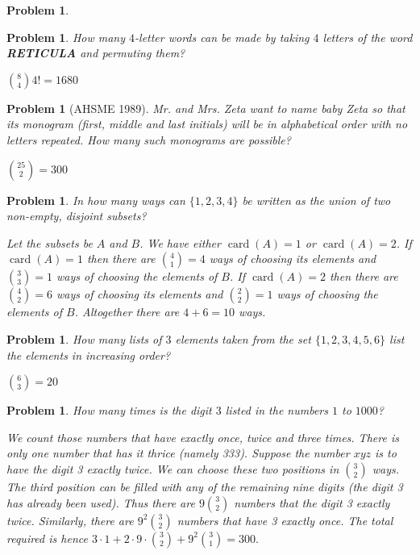 \documentclass[11pt, openany]{book}
\theoremstyle{change} \theoremheaderfont{\blue\sffamily\bfseries}
\newtheorem{pro}[thm]{Problem}
\theoremstyle{nonumberplain} \theoremheaderfont{\sffamily\bfseries}
\def\binom#1#2{{#1\choose#2}}
\newcommand{\dis}{\displaystyle}
\newcommand{\í}{\'{\i}}
\def\card#1{\operatorname{card}\left(#1\right)}
\begin{document}
\begin{multicols}{2}
\begin{pro}
\begin{answer}
\end{answer}
   \end{pro}
      \begin{pro}
How many $4$-letter words can be made by taking $4$ letters  of the
word {\bf RETICULA} and permuting them?
\begin{answer}$\binom{8}{4}4! = 1680$
\end{answer}
  \end{pro}
   \begin{pro}[AHSME 1989] Mr. and Mrs. Zeta want to name baby Zeta so
that its monogram (first, middle and last initials) will be in
alphabetical order with no letters repeated. How many such monograms
are possible?
\begin{answer} $\binom{25}{2} = 300$
\end{answer}
  \end{pro}
\begin{pro}
In how many ways can $\{1,2,3,4\}$ be written as the union of two
non-empty, disjoint subsets?
\begin{answer}
Let the subsets be $A$ and $B$. We have either $\card{A} = 1$ or
$\card{A} = 2$. If $\card{A} = 1$ then there are $\binom{4}{1}=4$
ways of choosing its elements and $\binom{3}{3}=1$ ways of choosing
the elements of $B$. If $\card{A} = 2$ then  there are
$\binom{4}{2}=6$ ways of choosing its elements and $\binom{2}{2}=1$
ways of choosing the elements of $B$. Altogether there are $4+6 =
10$ ways.

\end{answer}
\end{pro}

\begin{pro}
How many  lists of $3$ elements taken from the set $\{1,2,3,4,5,6\}$
 list the elements in increasing order?
 \begin{answer}  $\dis{\binom{6}{3} =
20}$
\end{answer}
\end{pro}
\begin{pro} How many times is the digit $3$ listed in the numbers $1$ to
$1000$? \begin{answer} We count those numbers that have exactly
once, twice and three times. There is only one number that has it
thrice (namely 333). Suppose the number $xyz$ is to have the digit 3
exactly twice. We can choose these two positions in $\binom{3}{2}$
ways. The third position can be filled with any of the remaining
nine digits (the digit 3 has already been used). Thus there are
$9\binom{3}{2}$ numbers that the digit 3 exactly twice. Similarly,
there are $9^2 \binom{3}{2}$ numbers that have 3 exactly once. The
total required is hence $3\cdot 1 + 2\cdot 9\cdot\binom{3}{2} + 9^2
\binom{3}{1} = 300.$
\end{answer}
\end{pro}



\end{multicols}
\end{document}
